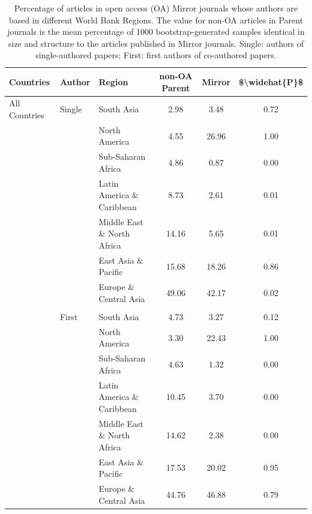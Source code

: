 \documentclass[
  english,
  man]{apa6}
\begin{document}
\begin{table}

\caption{\label{tab:Table4}Percentage of articles in open access (OA) Mirror journals whose authors are based in different World Bank Regions. The value for non-OA articles in Parent journals is the mean percentage of 1000 bootstrap-generated samples identical in size and structure to the articles published in Mirror journals. Single: authors of single-authored papers; First: first authors of co-authored papers.}
\centering
\fontsize{12}{14}\selectfont
\begin{tabular}[t]{lllccc}
\toprule
Countries & Author & Region & non-OA Parent & Mirror & \$\textbackslash{}widehat\{P\}\$\\
\midrule
All Countries & Single & South Asia & 2.98 & 3.48 & 0.72\\
 &  & North America & 4.55 & 26.96 & 1.00\\
 &  & Sub-Saharan Africa & 4.86 & 0.87 & 0.00\\
 &  & Latin America \& Caribbean & 8.73 & 2.61 & 0.01\\
 &  & Middle East \& North Africa & 14.16 & 5.65 & 0.01\\
 &  & East Asia \& Pacific & 15.68 & 18.26 & 0.86\\
 &  & Europe \& Central Asia & 49.06 & 42.17 & 0.02\\
 &  &  &  &  & \\
 & First & South Asia & 4.73 & 3.27 & 0.12\\
 &  & North America & 3.30 & 22.43 & 1.00\\
 &  & Sub-Saharan Africa & 4.63 & 1.32 & 0.00\\
 &  & Latin America \& Caribbean & 10.45 & 3.70 & 0.00\\
 &  & Middle East \& North Africa & 14.62 & 2.38 & 0.00\\
 &  & East Asia \& Pacific & 17.53 & 20.02 & 0.95\\
 &  & Europe \& Central Asia & 44.76 & 46.88 & 0.79\\
\bottomrule
\end{tabular}
\end{table}
\end{document}
